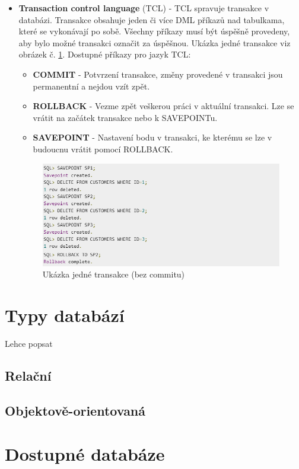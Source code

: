 \begin{itemize}
\item \textbf{Transaction control language} (TCL) - TCL spravuje transakce v databázi. Transakce obsahuje jeden či více DML příkazů nad tabulkama, které se vykonávají po sobě. Všechny příkazy musí být úspěšně provedeny, aby bylo možné transakci označit za úspěšnou. Ukázka jedné transakce viz obrázek č. \ref{fig:tcl_savepoint}. Dostupné příkazy pro jazyk TCL:
	\begin{itemize}
	\item \textbf{COMMIT} - Potvrzení transakce, změny provedené v transakci jsou permanentní a nejdou vzít zpět.
	\item \textbf{ROLLBACK} - Vezme zpět veškerou práci v aktuální transakci. Lze se vrátit na začátek transakce nebo k SAVEPOINTu.
	\item \textbf{SAVEPOINT} - Nastavení bodu v transakci, ke kterému se lze v budoucnu vrátit pomocí ROLLBACK.
	\end{itemize}

	\begin{figure}[h!]
	\centering
	\includegraphics[width=14cm]{img/tcl_savepoint}
	\caption{Ukázka jedné transakce (bez commitu)}
	\label{fig:tcl_savepoint}
	\end{figure}
\end{itemize}

\section{Typy databází}
Lehce popsat
\subsection{Relační}
\subsection{Objektově-orientovaná}
\section{Dostupné databáze}
